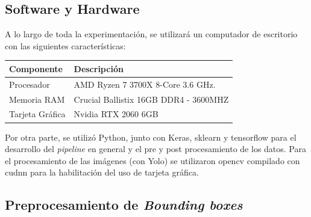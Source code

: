\subsection{Software y Hardware}
A lo largo de toda la experimentación, se utilizará un computador de escritorio con las siguientes características:

\begin{table}[h!]
\centering
\footnotesize
\begin{tabular}{|l|l|}
\hline
\textbf{Componente} & \textbf{Descripción} \\ \hline
Procesador & AMD Ryzen 7 3700X 8-Core 3.6 GHz. \\ \hline
Memoria RAM & Crucial Ballistix 16GB DDR4 - 3600MHZ \\ \hline
Tarjeta Gráfica & Nvidia RTX 2060 6GB \\ \hline
\end{tabular}
\end{table}

Por otra parte, se utilizó Python, junto con Keras, sklearn y tensorflow para el desarrollo del \textit{pipeline} en general y el pre y post procesamiento de los datos. Para el procesamiento de las imágenes (con Yolo) se utilizaron opencv compilado con cudnn para la habilitación del uso de tarjeta gráfica. 

\subsection{Preprocesamiento de \textit{Bounding boxes}}

